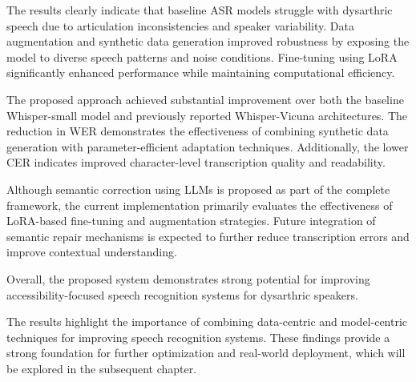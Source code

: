 The results clearly indicate that baseline ASR models struggle with dysarthric speech due to articulation inconsistencies and speaker variability. Data augmentation and synthetic data generation improved robustness by exposing the model to diverse speech patterns and noise conditions. Fine-tuning using LoRA significantly enhanced performance while maintaining computational efficiency.

The proposed approach achieved substantial improvement over both the baseline Whisper-small model and previously reported Whisper-Vicuna architectures. The reduction in WER demonstrates the effectiveness of combining synthetic data generation with parameter-efficient adaptation techniques. Additionally, the lower CER indicates improved character-level transcription quality and readability.

Although semantic correction using LLMs is proposed as part of the complete framework, the current implementation primarily evaluates the effectiveness of LoRA-based fine-tuning and augmentation strategies. Future integration of semantic repair mechanisms is expected to further reduce transcription errors and improve contextual understanding.

Overall, the proposed system demonstrates strong potential for improving accessibility-focused speech recognition systems for dysarthric speakers.

The results highlight the importance of combining data-centric and model-centric techniques for improving speech recognition systems. These findings provide a strong foundation for further optimization and real-world deployment, which will be explored in the subsequent chapter.
